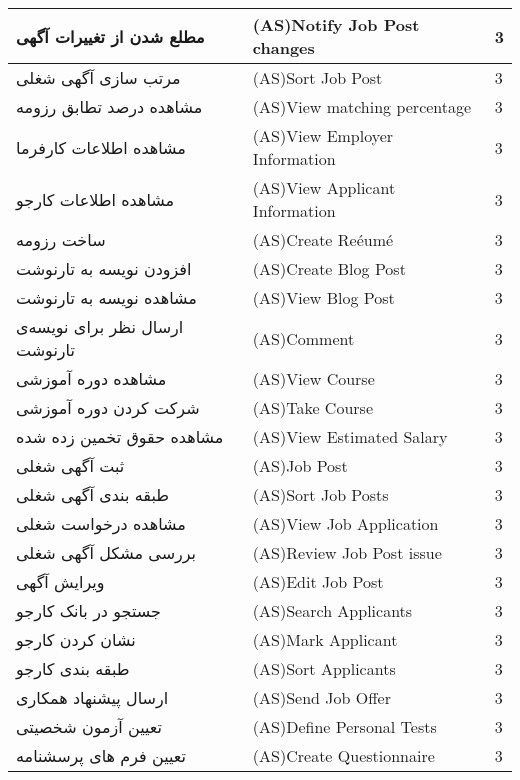 \documentclass[12pt]{article}
\begin{document}
\begin{longtable}{|l|l|l|}
		\hline
		مطلع شدن از تغییرات آگهی‌ & (AS)Notify Job Post changes & 3     \\
		\hline
		مرتب سازی آگهی شغلی & (AS)Sort Job Post & 3     \\
		\hline
		مشاهده درصد تطابق رزومه & (AS)View matching percentage & 3     \\
		\hline
		مشاهده اطلاعات کارفرما & (AS)View Employer Information & 3     \\
		\hline
		مشاهده اطلاعات کارجو & (AS)View Applicant Information & 3     \\
		\hline
		ساخت رزومه & (AS)Create Reéumé & 3     \\
		\hline
		افزودن نویسه به تارنوشت & (AS)Create Blog Post & 3     \\
		\hline
		مشاهده نویسه به تارنوشت & (AS)View Blog Post & 3     \\
		\hline
		ارسال نظر برای نویسه‌ی تارنوشت & (AS)Comment & 3     \\
		\hline
		مشاهده دوره آموزشی & (AS)View Course & 3     \\
		\hline
		شرکت کردن دوره آموزشی & (AS)Take Course & 3     \\
		\hline
		مشاهده حقوق تخمین زده شده & (AS)View Estimated Salary & 3     \\
		\hline
		ثبت آگهی شغلی & (AS)Job Post & 3     \\
		\hline
		طبقه بندی آگهی شغلی & (AS)Sort Job Posts & 3     \\
		\hline
		مشاهده درخواست شغلی & (AS)View Job Application & 3     \\
		\hline
		بررسی مشکل آگهی شغلی & (AS)Review Job Post issue & 3     \\
		\hline
		ویرایش آگهی & (AS)Edit Job Post & 3     \\
		\hline
		جستجو در بانک کارجو & (AS)Search Applicants & 3     \\
		\hline
		نشان کردن کارجو & (AS)Mark Applicant & 3     \\
		\hline
		طبقه بندی کارجو & (AS)Sort Applicants & 3     \\
		\hline
		ارسال پیشنهاد همکاری & (AS)Send Job Offer & 3     \\
		\hline
		تعیین آزمون شخصیتی & (AS)Define Personal Tests & 3     \\
		\hline
		تعیین فرم های پرسشنامه & (AS)Create Questionnaire & 3     \\
		\hline

\end{longtable}
\end{document}
